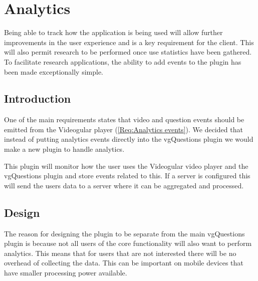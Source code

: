 
\chapter{Analytics} \label{Chapter: Analytics}

\begin{preamble}
	Being able to track how the application is being used will allow further improvements in the user experience and is a key requirement for the client. This will also permit research to be performed once use statistics have been gathered. To facilitate research applications, the ability to add events to the plugin has been made exceptionally simple.
\end{preamble}

\section{Introduction}

One of the main requirements states  that video and question events should be emitted from the Videogular player (\cref{Req:Analytics events}). We decided that instead of putting analytics events directly into the \gls{vgQuestions} plugin we would make a new plugin to handle analytics.

This plugin will monitor how the user uses the \gls{Videogular} video player and the \gls{vgQuestions} plugin and store events related to this. If a server is configured this will send the users data to a server where it can be aggregated and processed.

\section{Design}

The reason for designing the plugin to be separate from the main \gls{vgQuestions} plugin is because not all users of the core functionality will also want to perform analytics. This means that for users that are not interested there will be no overhead of collecting the data. This can be important on mobile devices that have smaller processing power available.

